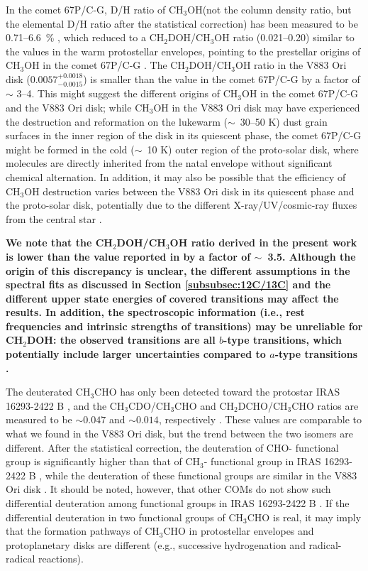 \documentclass[twocolumn, twocolappendix, astrosymb, times]{aastex631}
\newcommand{\methanol}{CH$_3$OH\xspace}
\newcommand{\acetaldehyde}{CH$_3$CHO\xspace}
\begin{document}
In the comet 67P/C-G, D/H ratio of \methanol (not the column density ratio, but the elemental D/H ratio after the statistical correction) has been measured to be 0.71--6.6~\% \citep{Drozdovskaya2021}, which reduced to a CH$_2$DOH/CH$_3$OH ratio (0.021--0.20) similar to the values in the warm protostellar envelopes, pointing to the prestellar origins of \methanol in the comet 67P/C-G \citep{Drozdovskaya2021}. The CH$_2$DOH/\methanol ratio in the V883 Ori disk ($0.0057_{-0.0015}^{+0.0018}$) is smaller than the value in the comet 67P/C-G by a factor of $\sim$ 3--4. This might suggest the different origins of \methanol in the comet 67P/C-G and the V883 Ori disk; while \methanol in the V883 Ori disk may have experienced the destruction and reformation on the lukewarm ($\sim$~30--50 K) dust grain surfaces in the inner region of the disk in its quiescent phase, the comet 67P/C-G might be formed in the cold ($\sim$~10 K) outer region of the proto-solar disk, where molecules are directly inherited from the natal envelope without significant chemical alternation. In addition, it may also be possible that the efficiency of \methanol destruction varies between the V883 Ori disk in its quiescent phase and the proto-solar disk, potentially due to the different X-ray/UV/cosmic-ray fluxes from the central star \citep{Notsu2021}.

\textbf{We note that the CH$_2$DOH/\methanol ratio derived in the present work is lower than the value reported in \citet{Lee2019} by a factor of $\sim$~3.5. Although the origin of this discrepancy is unclear, the different assumptions in the spectral fits as discussed in Section \ref{subsubsec:12C/13C} and the different upper state energies of covered transitions may affect the results. In addition, the spectroscopic information (i.e., rest frequencies and intrinsic strengths of transitions) may be unreliable for CH$_2$DOH: the observed transitions are all $b$-type transitions, which potentially include larger uncertainties compared to $a$-type transitions \citep{Pearson2012, Watanabe2021, Ohno2022}. }

The deuterated \acetaldehyde has only been detected toward the protostar IRAS 16293-2422 B \citep{Coudert2019}, and the CH$_3$CDO/\acetaldehyde and CH$_2$DCHO/\acetaldehyde ratios are measured to be $\sim0.047$ and $\sim0.014$, respectively \citep{Manigand2020}. These values are comparable to what we found in the V883 Ori disk, but the trend between the two isomers are different. After the statistical correction, the deuteration of CHO- functional group is significantly higher than that of CH$_3$- functional group in IRAS 16293-2422 B \citep{Manigand2020}, while the deuteration of these functional groups are similar in the V883 Ori disk . It should be noted, however, that other COMs do not show such differential deuteration among functional groups in IRAS 16293-2422 B \citep{Jorgensen2018}. If the differential deuteration in two functional groups of \acetaldehyde is real, it may imply that the formation pathways of \acetaldehyde in protostellar envelopes and protoplanetary disks are different (e.g., successive hydrogenation and radical-radical reactions). 
\end{document}
